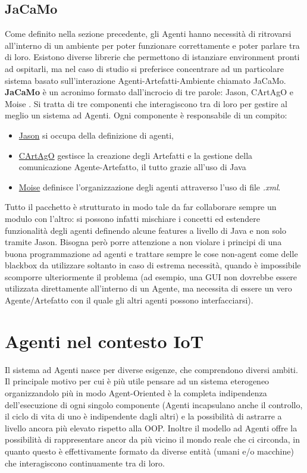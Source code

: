 \documentclass[12pt,a4paper,openright,oneside]{report}
\begin{document}
\subsection{JaCaMo}
Come definito nella sezione precedente, gli Agenti hanno necessità di ritrovarsi all'interno di un ambiente per poter funzionare correttamente e poter parlare tra di loro. Esistono diverse librerie che permettono di istanziare environment pronti ad ospitarli, ma nel caso di studio si preferisce concentrare ad un particolare sistema basato sull'interazione Agenti-Artefatti-Ambiente chiamato JaCaMo.\\

\textbf{JaCaMo} \cite{jacamo} è un acronimo formato dall'incrocio di tre parole: Jason, CArtAgO \cite{cartago} e Moise \cite{moise}. Si tratta di tre componenti che interagiscono tra di loro per gestire al meglio un sistema ad Agenti. Ogni componente è responsabile di un compito:

\begin{itemize}
	\item \ul{Jason} si occupa della definizione di agenti,
	\item \ul{CArtAgO} gestisce la creazione degli Artefatti e la gestione della comunicazione Agente-Artefatto, il tutto grazie all'uso di Java
	\item \ul{Moise} definisce l'organizzazione degli agenti attraverso l'uso di file \textit{.xml}.
\end{itemize}

Tutto il pacchetto è strutturato in modo tale da far collaborare sempre un modulo con l'altro: si possono infatti mischiare i concetti ed estendere funzionalità degli agenti definendo alcune features a livello di Java e non solo tramite Jason. Bisogna però porre attenzione a non violare i principi di una buona programmazione ad agenti e trattare sempre le cose non-agent come delle blackbox da utilizzare soltanto in caso di estrema necessità, quando è impossibile scomporre ulteriormente il problema (ad esempio, una GUI non dovrebbe essere utilizzata direttamente all'interno di un Agente, ma necessita di essere un vero Agente/Artefatto con il quale gli altri agenti possono interfacciarsi).

\section{Agenti nel contesto IoT}

Il sistema ad Agenti nasce per diverse esigenze, che comprendono diversi ambiti. Il principale motivo per cui è più utile pensare ad un sistema eterogeneo organizzandolo più in modo Agent-Oriented è la completa indipendenza dell'esecuzione di ogni singolo componente (Agenti incapsulano anche il controllo, il ciclo di vita di uno è indipendente dagli altri) e la possibilità di astrarre a livello ancora più elevato rispetto alla OOP. Inoltre il modello ad Agenti offre la possibilità di rappresentare ancor da più vicino il mondo reale che ci circonda, in quanto questo è effettivamente formato da diverse entità (umani e/o macchine) che interagiscono continuamente tra di loro.\\
\end{document}
